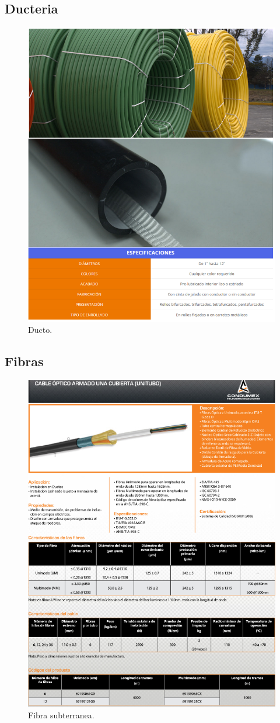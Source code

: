 \documentclass[12pt,letterpaper]{article}
\begin{document}
\newpage
\subsection{Ducteria}
\begin{figure}[ht]
    \centering
    \includegraphics[width=.7\textwidth]{imagenes/ductos.PNG}
    \caption{Ducto.}
\end{figure}

\newpage
\subsection{Fibras}
\begin{figure}[ht]
    \centering
    \includegraphics[width=.67\textwidth]{imagenes/fibra1.PNG}
    \caption{Fibra subterranea.}
\end{figure}
\end{document}
